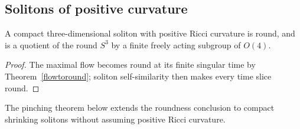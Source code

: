 \subsection{Solitons of positive curvature}
\begin{theorem}
\label{thm:positive-ricci-soliton-round}\label{sphsf}
A compact three-dimensional soliton with positive Ricci curvature is round,
and is a quotient of the round $S^3$ by a finite freely acting subgroup of
$O(4)$.
\end{theorem}
\begin{proof}
\sketch The maximal flow becomes round at its finite singular time by
Theorem~\ref{flowtoround}; soliton self-similarity then makes every time slice
round.
\end{proof}
\begin{remark}
\label{rem:roundness-shrinking-soliton-preview}

The pinching theorem below extends the roundness conclusion to compact
shrinking solitons without assuming positive Ricci curvature.
\end{remark}

